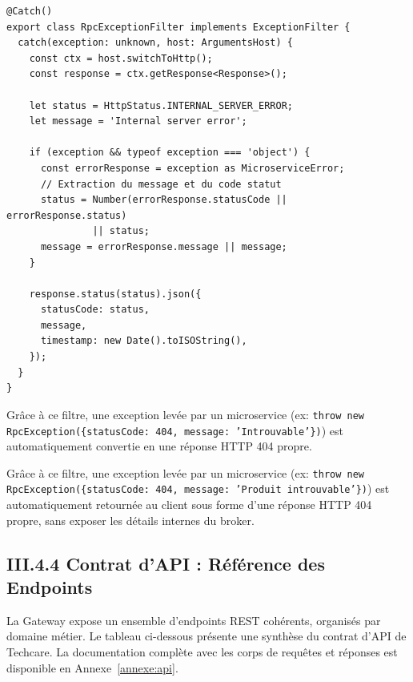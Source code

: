 \begin{verbatim}
@Catch()
export class RpcExceptionFilter implements ExceptionFilter {
  catch(exception: unknown, host: ArgumentsHost) {
    const ctx = host.switchToHttp();
    const response = ctx.getResponse<Response>();
    
    let status = HttpStatus.INTERNAL_SERVER_ERROR;
    let message = 'Internal server error';

    if (exception && typeof exception === 'object') {
      const errorResponse = exception as MicroserviceError;
      // Extraction du message et du code statut
      status = Number(errorResponse.statusCode || errorResponse.status) 
               || status;
      message = errorResponse.message || message;
    }

    response.status(status).json({
      statusCode: status,
      message,
      timestamp: new Date().toISOString(),
    });
  }
}
\end{verbatim}

Grâce à ce filtre, une exception levée par un microservice (ex: \texttt{throw new RpcException(\{statusCode: 404, message: 'Introuvable'\})}) est automatiquement convertie en une réponse HTTP 404 propre.

Grâce à ce filtre, une exception levée par un microservice (ex: \texttt{throw new RpcException(\{statusCode: 404, message: 'Produit introuvable'\})}) est automatiquement retournée au client sous forme d'une réponse HTTP 404 propre, sans exposer les détails internes du broker.

\subsection{III.4.4 Contrat d'API : Référence des Endpoints}
La Gateway expose un ensemble d'endpoints REST cohérents, organisés par domaine métier. Le tableau ci-dessous présente une synthèse du contrat d'API de Techcare. La documentation complète avec les corps de requêtes et réponses est disponible en Annexe~\ref{annexe:api}.

